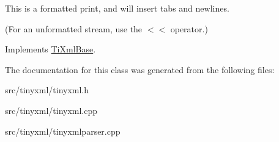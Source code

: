 This is a formatted print, and will insert tabs and newlines.

(For an unformatted stream, use the $<$$<$ operator.) 

Implements \hyperlink{classTiXmlBase_a0de56b3f2ef14c65091a3b916437b512}{Ti\+Xml\+Base}.



The documentation for this class was generated from the following files\+:\begin{DoxyCompactItemize}
\item 
src/tinyxml/tinyxml.\+h\item 
src/tinyxml/tinyxml.\+cpp\item 
src/tinyxml/tinyxmlparser.\+cpp\end{DoxyCompactItemize}
